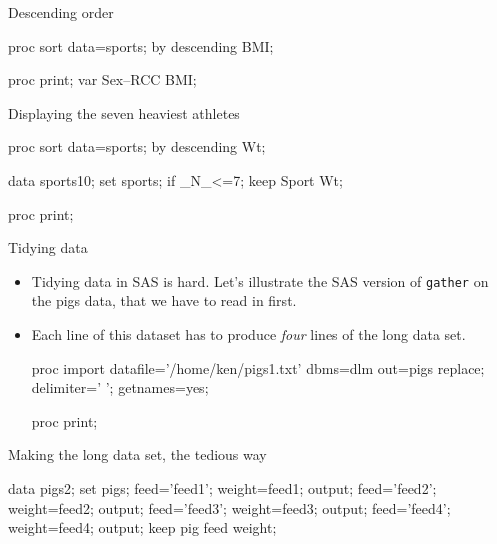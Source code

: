 \documentclass[unknownkeysallowed]{beamer}\usepackage[]{graphicx}\usepackage[]{color}
\begin{document}
\begin{frame}[fragile]{Descending order}
  
  
  \begin{Sascode}[store=tl]
proc sort data=sports;
  by descending BMI;
  
proc print;  
  var Sex--RCC BMI;
  \end{Sascode}
  
  
\end{frame}

\begin{frame}[fragile]{Displaying the seven heaviest athletes}
  
  \begin{Sascode}[store=tm]
proc sort data=sports;
  by descending Wt;
  
data sports10;
  set sports;
  if _N_<=7;
  keep Sport Wt;
  
proc print;
  \end{Sascode}
  
  
\end{frame}

\begin{frame}[fragile]{Tidying data}
  
  \begin{itemize}
  \item Tidying data in SAS is hard. Let's illustrate the SAS version
    of \texttt{gather} on the pigs data, that we have to read in first.
  \item Each line of this dataset has to produce \emph{four} lines
    of the long data set. 
    
    \begin{Datastep}
proc import 
  datafile='/home/ken/pigs1.txt'
  dbms=dlm out=pigs replace;
  delimiter=' ';
  getnames=yes;
    \end{Datastep}
    
    \begin{Sascode}[store=tn]
proc print;      
    \end{Sascode}
    
    
  \end{itemize}
  
\end{frame}

\begin{frame}[fragile]{Making the long data set, the tedious way}
  
  \begin{Datastep}
data pigs2;
  set pigs;
  feed='feed1';
  weight=feed1;
  output;
  feed='feed2';
  weight=feed2;
  output;
  feed='feed3';
  weight=feed3;
  output;
  feed='feed4';
  weight=feed4;
  output;
  keep pig feed weight;
  \end{Datastep}
  
\end{frame}
\end{document}
